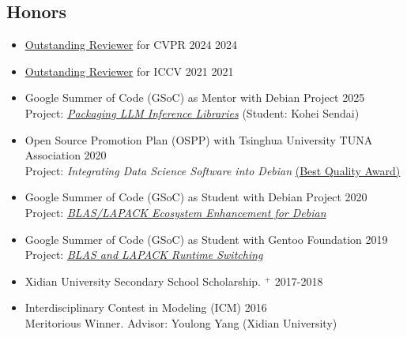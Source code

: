 \documentclass[10pt,margin,line,pifont,palatino,courier]{res}
\begin{document}
\begin{resume}
\section{\sc Honors}

\begin{itemize}[leftmargin=*]
    \item \href{https://cvpr.thecvf.com/Conferences/2024/ProgramCommittee}{\underline{Outstanding Reviewer}} for CVPR 2024 \hfill 2024
    \item \href{http://iccv2021.thecvf.com/outstanding-reviewers}{\underline{Outstanding Reviewer}} for ICCV 2021 \hfill 2021
    \item Google Summer of Code (GSoC) as Mentor with Debian Project \hfill 2025\\
        Project: \href{https://summerofcode.withgoogle.com/programs/2025/projects/Ui7418HU}
        {\textit{Packaging LLM Inference Libraries}} (Student: Kohei Sendai)
    \item Open Source Promotion Plan (OSPP) with Tsinghua University TUNA Association \hfill 2020\\
        {\small Project: \textit{Integrating Data Science Software into Debian} \href{https://isrc.iscas.ac.cn/summer2020/#/announcement}{(Best Quality Award)}}
    \item Google Summer of Code (GSoC) as Student with Debian Project \hfill 2020\\
        {\small Project: \href{https://summerofcode.withgoogle.com/archive/2020/projects/6021080197627904}
        {\textit{BLAS/LAPACK Ecosystem Enhancement for Debian}}}
    \item Google Summer of Code (GSoC) as Student with Gentoo Foundation \hfill 2019\\
        {\small Project: \href{https://summerofcode.withgoogle.com/archive/2019/projects/6513450073718784}
        {\textit{BLAS and LAPACK Runtime Switching}}}
    \item Xidian University Secondary School Scholarship.%
        \href{http://see.xidian.edu.cn/html/news/9732.html}{$^+$} \hfill 2017-2018
    \item Interdisciplinary Contest in Modeling (ICM) \hfill 2016\\
        {\small Meritorious Winner. Advisor: Youlong Yang (Xidian University)}
\end{itemize}



\end{resume}
\end{document}
